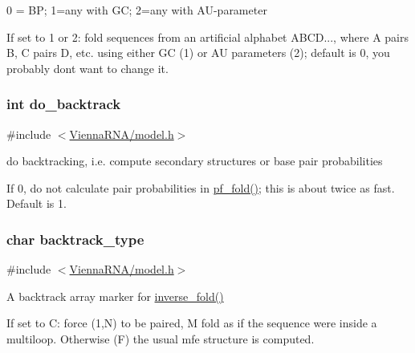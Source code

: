 0 = BP; 1=any with GC; 2=any with A\+U-\/parameter 

If set to 1 or 2\+: fold sequences from an artificial alphabet A\+B\+CD..., where A pairs B, C pairs D, etc. using either GC (1) or AU parameters (2); default is 0, you probably don\textquotesingle{}t want to change it. 
\subsubsection[{\texorpdfstring{do\+\_\+backtrack}{do_backtrack}}]{\setlength{\rightskip}{0pt plus 5cm}int do\+\_\+backtrack}\hypertarget{group__model__details_gad512b5dd4dbec60faccfe137bb474489}{}\label{group__model__details_gad512b5dd4dbec60faccfe137bb474489}


{\ttfamily \#include $<$\hyperlink{model_8h}{Vienna\+R\+N\+A/model.\+h}$>$}



do backtracking, i.\+e. compute secondary structures or base pair probabilities 

If 0, do not calculate pair probabilities in \hyperlink{group__pf__fold_gadc3db3d98742427e7001a7fd36ef28c2}{pf\+\_\+fold()}; this is about twice as fast. Default is 1. 
\subsubsection[{\texorpdfstring{backtrack\+\_\+type}{backtrack_type}}]{\setlength{\rightskip}{0pt plus 5cm}char backtrack\+\_\+type}\hypertarget{group__model__details_ga83bdb43472a259c71e69fa9f70f420c3}{}\label{group__model__details_ga83bdb43472a259c71e69fa9f70f420c3}


{\ttfamily \#include $<$\hyperlink{model_8h}{Vienna\+R\+N\+A/model.\+h}$>$}



A backtrack array marker for \hyperlink{group__inverse__fold_ga7af026de55d4babad879f2c92559cbbc}{inverse\+\_\+fold()} 

If set to \textquotesingle{}C\textquotesingle{}\+: force (1,N) to be paired, \textquotesingle{}M\textquotesingle{} fold as if the sequence were inside a multiloop. Otherwise (\textquotesingle{}F\textquotesingle{}) the usual mfe structure is computed. 
